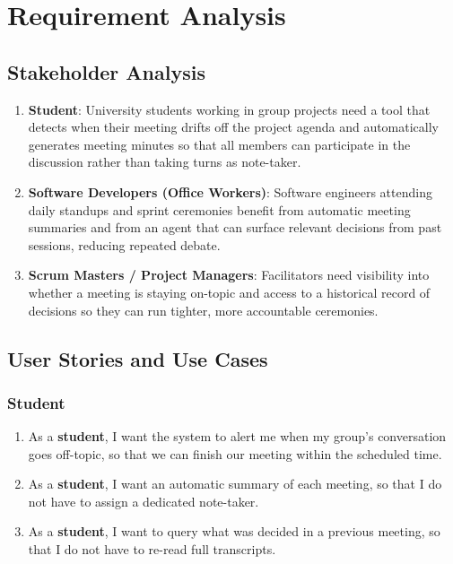 \chapter{Requirement Analysis}
\label{chap:requirement-analysis}

\section{Stakeholder Analysis}
\label{section:stakeholder-analysis}

\begin{enumerate}[leftmargin=50pt]
    \item \textbf{Student}: University students working in group projects need a tool that detects when their
          meeting drifts off the project agenda and automatically generates meeting minutes so that all
          members can participate in the discussion rather than taking turns as note-taker.
    \item \textbf{Software Developers (Office Workers)}: Software engineers attending daily standups and sprint
          ceremonies benefit from automatic meeting summaries and from an agent that can surface relevant
          decisions from past sessions, reducing repeated debate.
    \item \textbf{Scrum Masters / Project Managers}: Facilitators need visibility into whether a meeting is
          staying on-topic and access to a historical record of decisions so they can run tighter, more
          accountable ceremonies.
\end{enumerate}

\section{User Stories and Use Cases}
\label{section:user-stories-use-cases}
\subsection{Student}
\label{section:student-user-stories}

\begin{enumerate}[leftmargin=80pt]
    \item As a \textbf{student}, I want the system to alert me when my group's conversation goes off-topic, so that we can finish our meeting within the scheduled time.
    \item As a \textbf{student}, I want an automatic summary of each meeting, so that I do not have to assign a dedicated note-taker.
    \item As a \textbf{student}, I want to query what was decided in a previous meeting, so that I
          do not have to re-read full transcripts.
\end{enumerate}

